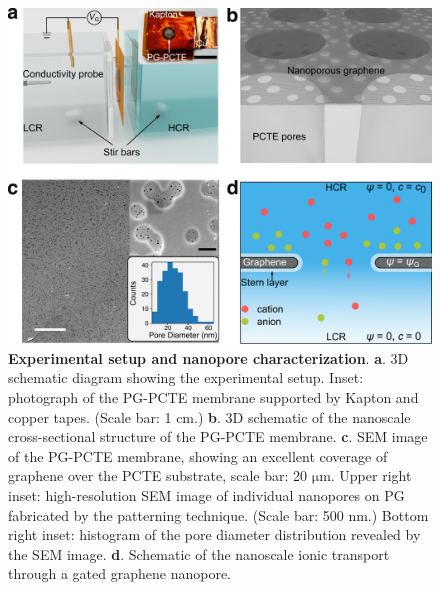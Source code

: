 \documentclass[journal=langd5,email=true, hyperref=true, keywords=false]{achemso}
\begin{document}
\begin{figure}[htbp]
  \centering
  \includegraphics[width=0.95\linewidth]{img/fig1.pdf}
  \caption{\textbf{Experimental setup and nanopore characterization}.
    \textbf{a}. 3D schematic diagram showing the experimental
    setup. Inset: photograph of the PG-PCTE membrane supported by
    Kapton and copper tapes. (Scale bar: 1 cm.) \textbf{b}. 3D schematic
    of the nanoscale cross-sectional structure of the PG-PCTE
    membrane. \textbf{c}. SEM image of the PG-PCTE membrane, showing an
    excellent coverage of graphene over the PCTE substrate, scale bar:
    20 $\mathrm{\mu}$m.  Upper right inset: high-resolution SEM image
    of individual nanopores on PG fabricated by the patterning
    technique. (Scale bar: 500 nm.) Bottom right inset: histogram of the
    pore diameter distribution revealed by the SEM
    image. \textbf{d}. Schematic of the nanoscale ionic transport
    through a gated graphene nanopore.}
  \label{fig:1}
\end{figure}
\end{document}
